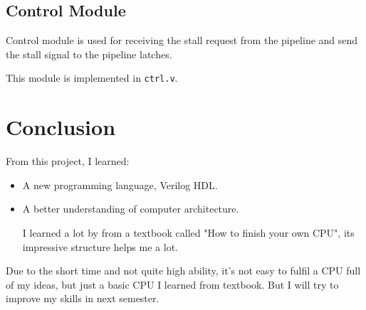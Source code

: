 \documentclass{article}
\begin{document}
\subsection{Control Module}
Control module is used for receiving the stall request from the pipeline and send the stall signal to the pipeline latches.

This module is implemented in \texttt{ctrl.v}.

\newpage
\section{Conclusion}
From this project, I learned: 
\begin{itemize}
\item
A new programming language, Verilog HDL.

\item
A better understanding of computer architecture.

I learned a lot by from a textbook called "How to finish your own CPU", its impressive structure helps me a lot.
\end{itemize}
Due to the short time and not quite high ability, it's not easy to fulfil a CPU full of my ideas, but just a basic CPU I learned from textbook. But I will try to improve my skills in next semester.
\end{document}

